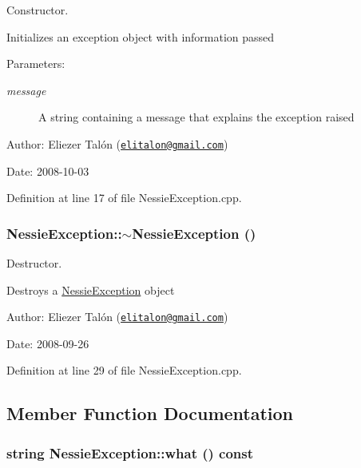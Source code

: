 Constructor. 

Initializes an exception object with information passed

\begin{Desc}
\item[Parameters:]
\begin{description}
\item[{\em message}]A string containing a message that explains the exception raised\end{description}
\end{Desc}
\begin{Desc}
\item[Author:]Eliezer Talón (\href{mailto:elitalon@gmail.com}{\tt elitalon@gmail.com}) \end{Desc}
\begin{Desc}
\item[Date:]2008-10-03 \end{Desc}


Definition at line 17 of file NessieException.cpp.\hypertarget{class_nessie_exception_19f44d2725dd53e2f10505a88e5773f2}{
\subsubsection[$\sim$NessieException]{\setlength{\rightskip}{0pt plus 5cm}NessieException::$\sim$NessieException ()}}
\label{class_nessie_exception_19f44d2725dd53e2f10505a88e5773f2}


Destructor. 

Destroys a \hyperlink{class_nessie_exception}{NessieException} object

\begin{Desc}
\item[Author:]Eliezer Talón (\href{mailto:elitalon@gmail.com}{\tt elitalon@gmail.com}) \end{Desc}
\begin{Desc}
\item[Date:]2008-09-26 \end{Desc}


Definition at line 29 of file NessieException.cpp.

\subsection{Member Function Documentation}
\hypertarget{class_nessie_exception_ec94145f2fd5febb7ca0b7587652b777}{
\subsubsection[what]{\setlength{\rightskip}{0pt plus 5cm}string NessieException::what () const}}
\label{class_nessie_exception_ec94145f2fd5febb7ca0b7587652b777}


